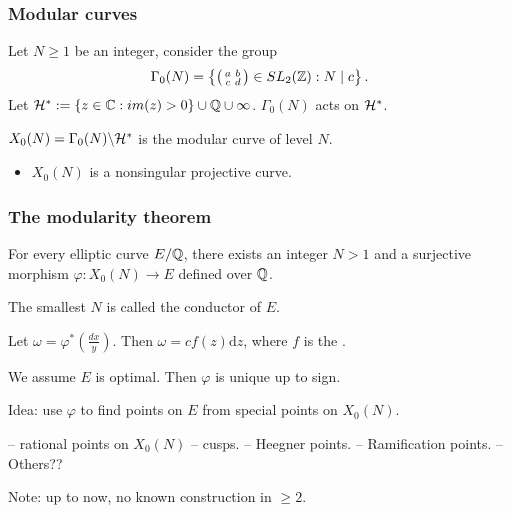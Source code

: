 \documentclass[handout]{beamer}
\begin{document}

\begin{frame}
\frametitle{Modular curves}
Let $N \geq 1$ be an integer, consider the group 
\[
	\Gamma_0(N) = \left \{ \left( \begin{smallmatrix}a&b\\c&d\end{smallmatrix}\right) \in SL_2(\mathbb{Z}): N \mid c \right\}.
\]
Let $\mathcal{H}^* := \{z \in \mathbb{C}: im(z) > 0\} \cup \mathbb{Q} \cup \infty$.  $\Gamma_0(N)$ acts on $\mathcal{H}^{*}$. 

\begin{Def}
$X_0(N) = \Gamma_0(N) \backslash \mathcal{H}^*$ is the modular curve of level $N$. 
\end{Def}

\begin{itemize}
\item $X_0(N)$ is a  nonsingular projective curve.
\end{itemize}
\end{frame}

\begin{frame}
\frametitle{The modularity theorem}


\begin{theorem}
For every elliptic curve $E/\mathbb{Q}$, there exists an integer $N > 1$ and a surjective morphism 
$\varphi: X_0(N) \to E$ defined over $\mathbb{Q}$.
\end{theorem}

\pause
\smallskip

The smallest $N$ is called the conductor of $E$.  \\
\smallskip

Let $\omega = \varphi^*(\frac{dx}{y})$. Then $\omega = c f(z) \mathrm{d} z$, where $f$ is the .  \\

\smallskip

We assume $E$ is optimal. Then $\varphi$ is unique up to sign.


\end{frame}
\begin{frame}

Idea:  use $\varphi$ to find points on $E$ from special points on $X_0(N)$. 

-- rational points on $X_0(N)$ -- cusps. 
-- Heegner points. 
-- Ramification points. 
-- Others?? 

Note: up to now, no known construction in $\geq 2$. 


\end{frame}
\end{document}
